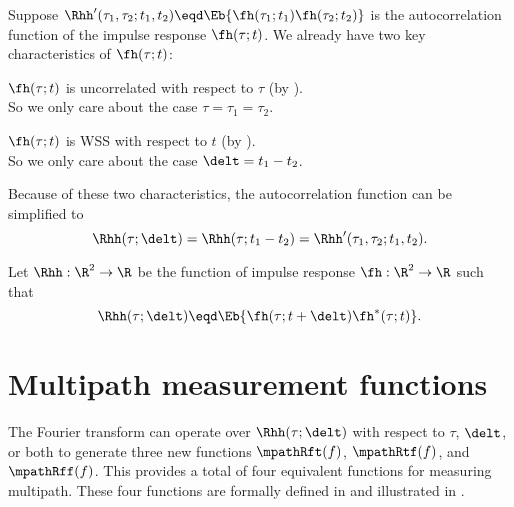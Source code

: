 Suppose 
$\Rhh'(\tau_1,\tau_2;t_1,t_2)\eqd\Eb{\fh(\tau_1;t_1)\fh(\tau_2;t_2)}$
is the autocorrelation function of the impulse response $\fh(\tau;t)$.
We already have two key characteristics of $\fh(\tau;t)$:
\begin{enume}
  \item $\fh(\tau;t)$ is uncorrelated with respect to $\tau$
        (by ).\\
        So we only care about the case $\tau=\tau_1=\tau_2$.
  \item $\fh(\tau;t)$ is WSS with respect to $t$
        (by ). \\
        So we only care about the case $\delt=t_1-t_2$.
\end{enume}
Because of these two characteristics, the autocorrelation function
can be simplified to 
\[ \Rhh(\tau;\delt)=\Rhh(\tau;t_1-t_2)=\Rhh'(\tau_1,\tau_2;t_1,t_2).\]

\begin{definition}
\label{def:mp_Rhh}
Let $\Rhh:\R^2\to\R$ be the  function
of impulse response $\fh:\R^2\to\R$ such that
  \[ \Rhh(\tau;\delt)\eqd\Eb{\fh(\tau;t+\delt)\fh^\ast(\tau;t)}. \]
\end{definition}

\section{Multipath measurement functions}
The Fourier transform can operate over $\Rhh(\tau;\delt)$
with respect to $\tau$, $\delt$, or both to generate three
new functions $\mpathRft(f)$, $\mpathRtf(f)$, and $\mpathRff(f)$.
This provides a total of four equivalent functions for 
measuring multipath.
These four functions are formally defined in 
 and illustrated in .


